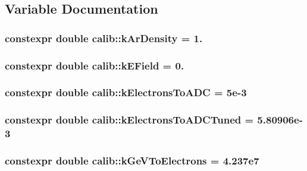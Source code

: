 \subsection{Variable Documentation}
\hypertarget{namespacecalib_a00c45eddb90e8aca9ed948b1ea350332}{
\subsubsection[{k\-Ar\-Density}]{\setlength{\rightskip}{0pt plus 5cm}constexpr double calib\-::k\-Ar\-Density = 1.}}\label{namespacecalib_a00c45eddb90e8aca9ed948b1ea350332}
\hypertarget{namespacecalib_a4c6174bb33f83da964ea510a61693d22}{
\subsubsection[{k\-E\-Field}]{\setlength{\rightskip}{0pt plus 5cm}constexpr double calib\-::k\-E\-Field = 0.}}\label{namespacecalib_a4c6174bb33f83da964ea510a61693d22}
\hypertarget{namespacecalib_afa4bc041094ec5d0c7d604620bcdfeb5}{
\subsubsection[{k\-Electrons\-To\-A\-D\-C}]{\setlength{\rightskip}{0pt plus 5cm}constexpr double calib\-::k\-Electrons\-To\-A\-D\-C = 5e-\/3}}\label{namespacecalib_afa4bc041094ec5d0c7d604620bcdfeb5}
\hypertarget{namespacecalib_aef1398d9c4d9d9723b373c2d2692b665}{
\subsubsection[{k\-Electrons\-To\-A\-D\-C\-Tuned}]{\setlength{\rightskip}{0pt plus 5cm}constexpr double calib\-::k\-Electrons\-To\-A\-D\-C\-Tuned = 5.\-80906e-\/3}}\label{namespacecalib_aef1398d9c4d9d9723b373c2d2692b665}
\hypertarget{namespacecalib_ae60a5755f9f465d0287d277650040d34}{
\subsubsection[{k\-Ge\-V\-To\-Electrons}]{\setlength{\rightskip}{0pt plus 5cm}constexpr double calib\-::k\-Ge\-V\-To\-Electrons = 4.\-237e7}}\label{namespacecalib_ae60a5755f9f465d0287d277650040d34}


